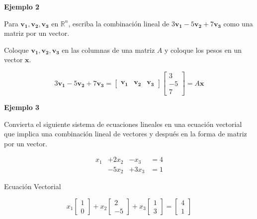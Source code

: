 \documentclass{article}
\begin{document}
\begin{large}
    \textbf{Ejemplo 2}
\end{large}

Para $\mathbf{v_1}, \mathbf{v_2}, \mathbf{v_3}$ en $\mathbb{R}^n$, escriba la combinación lineal de $3\mathbf{v_1} - 5\mathbf{v_2} + 7\mathbf{v_3}$ como una matriz por un vector.

Coloque $\mathbf{v_1}, \mathbf{v_2}, \mathbf{v_3}$ en las columnas de una matriz $A$ y coloque los pesos en un vector $\mathbf{x}$.

\begin{equation*}
    3\mathbf{v_1} - 5\mathbf{v_2} + 7\mathbf{v_3} = \begin{bmatrix}
        \mathbf{v_1} & \mathbf{v_2} & \mathbf{v_3}
    \end{bmatrix}
    \begin{bmatrix}
        3 \\-5\\7
    \end{bmatrix}
    = A\mathbf{x}
\end{equation*}

\begin{large}
    \textbf{Ejemplo 3}
\end{large}

Convierta el siguiente sistema de ecuaciones lineales en una ecuación vectorial que implica una combinación lineal de vectores y después en la forma de matriz por un vector.

\begin{equation*}
    \begin{aligned}
        x_1 &+ 2x_2 &- x_3 &= 4\\
            &-5x_2  &+3x_3 &= 1
    \end{aligned}
\end{equation*}

Ecuación Vectorial

\begin{equation*}
    x_1\begin{bmatrix} 1\\0 \end{bmatrix} 
    +x_2\begin{bmatrix} 2\\-5 \end{bmatrix}
    +x_3\begin{bmatrix} 1\\3 \end{bmatrix}
    =\begin{bmatrix} 4\\1 \end{bmatrix}
\end{equation*}
\end{document}
